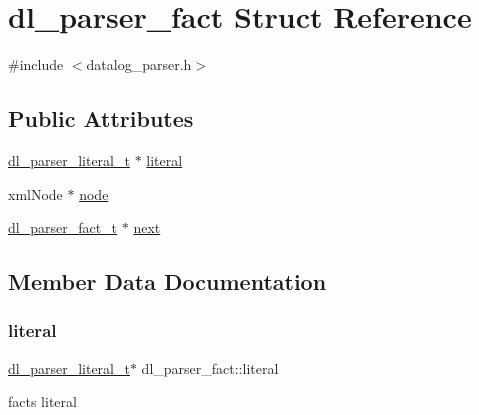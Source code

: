\hypertarget{structdl__parser__fact}{}\section{dl\+\_\+parser\+\_\+fact Struct Reference}
\label{structdl__parser__fact}


{\ttfamily \#include $<$datalog\+\_\+parser.\+h$>$}

\subsection*{Public Attributes}
\begin{DoxyCompactItemize}
\item 
\hyperlink{datalog__parser_8h_adaef2eede58b9f7698925f7194af1373}{dl\+\_\+parser\+\_\+literal\+\_\+t} $\ast$ \hyperlink{structdl__parser__fact_ad6af5d620e22add4536cdc82bc9fd8f2}{literal}
\item 
xml\+Node $\ast$ \hyperlink{structdl__parser__fact_a1a5d064b161e07cfacedd5cdf871d04f}{node}
\item 
\hyperlink{datalog__parser_8h_ad97776994371341952d410f045d73e72}{dl\+\_\+parser\+\_\+fact\+\_\+t} $\ast$ \hyperlink{structdl__parser__fact_a10999e64de8ea33101bf4c9234c1ff99}{next}
\end{DoxyCompactItemize}


\subsection{Member Data Documentation}
\mbox{\label{structdl__parser__fact_ad6af5d620e22add4536cdc82bc9fd8f2}} 
\subsubsection{\texorpdfstring{literal}{literal}}
{\footnotesize\ttfamily \hyperlink{datalog__parser_8h_adaef2eede58b9f7698925f7194af1373}{dl\+\_\+parser\+\_\+literal\+\_\+t}$\ast$ dl\+\_\+parser\+\_\+fact\+::literal}

fact\textquotesingle{}s literal \mbox{\label{structdl__parser__fact_a10999e64de8ea33101bf4c9234c1ff99}} 
